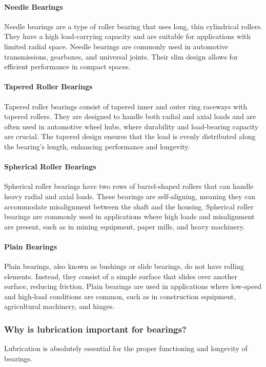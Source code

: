 \documentclass[../../main]{subfiles}
\begin{document}
\paragraph{Needle Bearings}
Needle bearings are a type of roller bearing that uses long, thin cylindrical rollers. They have a high load-carrying capacity and are suitable for applications with limited radial space. Needle bearings are commonly used in automotive transmissions, gearboxes, and universal joints. Their slim design allows for efficient performance in compact spaces.

\paragraph{Tapered Roller Bearings}
Tapered roller bearings consist of tapered inner and outer ring raceways with tapered rollers. They are designed to handle both radial and axial loads and are often used in automotive wheel hubs, where durability and load-bearing capacity are crucial. The tapered design ensures that the load is evenly distributed along the bearing's length, enhancing performance and longevity.

\paragraph{Spherical Roller Bearings}
Spherical roller bearings have two rows of barrel-shaped rollers that can handle heavy radial and axial loads. These bearings are self-aligning, meaning they can accommodate misalignment between the shaft and the housing. Spherical roller bearings are commonly used in applications where high loads and misalignment are present, such as in mining equipment, paper mills, and heavy machinery.

\paragraph{Plain Bearings}
Plain bearings, also known as bushings or slide bearings, do not have rolling elements. Instead, they consist of a simple surface that slides over another surface, reducing friction. Plain bearings are used in applications where low-speed and high-load conditions are common, such as in construction equipment, agricultural machinery, and hinges.

\subsubsection{Why is lubrication important for bearings?}
Lubrication is absolutely essential for the proper functioning and longevity of bearings.
\end{document}
